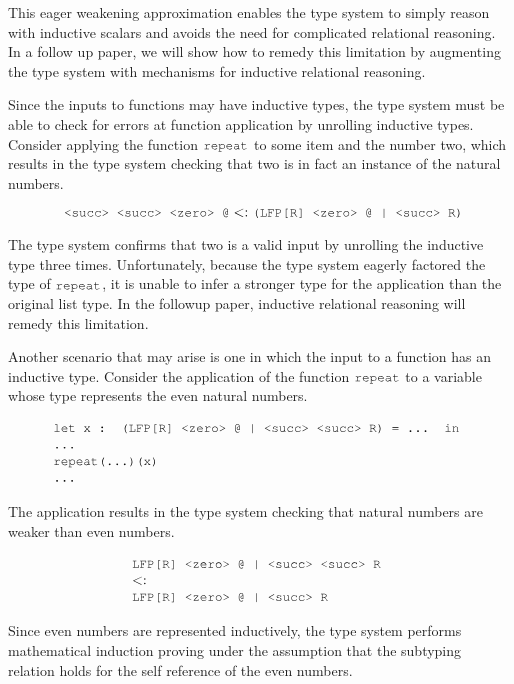 \documentclass[acmsmall]{acmart}
\theoremstyle{definition}
\begin{document}
\noindent
This eager weakening approximation enables the type system
to simply reason with inductive scalars and avoids the need for complicated
relational reasoning. In a follow up paper,
we will show how to remedy this limitation by augmenting the type system with
mechanisms for inductive relational reasoning.

Since the inputs to functions may have inductive types, the type 
system must be able to check for errors at function application by unrolling
inductive types.
Consider applying the function $\J{repeat}$ to some item and the number two, 
which results in the type system checking that two is in fact an instance of the natural numbers.

\[
  \J{ <succ> <succ> <zero> @} \subtypes \J{(LFP[R] <zero> @ | <succ> R)}
\]

\noindent
The type system confirms that two is a valid input by unrolling the inductive type three times.
Unfortunately, because the type system eagerly factored the type of $\J{repeat}$, it
is unable to infer a stronger type for the application than the original list type. 
In the followup paper, inductive relational reasoning will remedy this limitation.


Another scenario that may arise is one in which the input to a function has an inductive type.
Consider the application of the function $\J{repeat}$ to a variable whose type represents the even natural numbers.

\[
  \begin{array}[t]{@{} l}
    \J{let x : (LFP[R] <zero> @ | <succ> <succ> R) = ... in}
    \\
    \J{...}
    \\
    \J{repeat(...)(x)} 
    \\
    \J{...}
  \end{array}
\]

\noindent
The application results in the type system checking that natural numbers are weaker than even numbers. 

\[
  \begin{array}[t]{@{} l}
    \J{LFP[R] <zero> @ | <succ> <succ> R}
    \\
    \subtypes
    \\
    \J{LFP[R] <zero> @ | <succ> R}
  \end{array}
\]

\noindent
Since even numbers are represented inductively, the type system performs mathematical induction
proving under the assumption that the subtyping relation holds for the self reference of the even numbers. 
\end{document}
